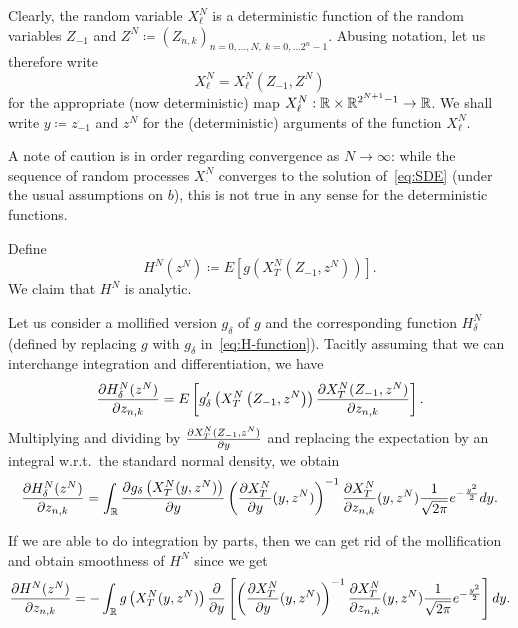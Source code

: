 Clearly, the random variable $X^N_\ell$ is a deterministic function of the
random variables $Z_{-1}$ and $Z^N \coloneqq \left(Z_{n,k} \right)_{n=0,
  \ldots, N, \ k=0, \ldots 2^n-1}$. Abusing notation, let us therefore write
\begin{equation*}
  X^N_\ell = X^N_\ell\left(Z_{-1}, Z^N \right)
\end{equation*}
for the appropriate (now deterministic) map $X^N_\ell: \mathbb{R} \times
\mathbb{R}^{2^{N+1}-1} \to \mathbb{R}$. We shall write $y \coloneqq z_{-1}$ and $z^N$ for the
(deterministic) arguments of the function $X^N_\ell$.

A note of caution is in order regarding convergence as $N \to \infty$: while
the sequence of random processes $X^N_\cdot$ converges to the solution
of~\eqref{eq:SDE} (under the usual assumptions on $b$), this is not true in
any sense for the deterministic functions.

Define
\begin{equation}
  \label{eq:H-function}
  H^N(z^N) \coloneqq E\left[ g\left( X^N_T\left( Z_{-1}, z^N \right) \right) \right].
\end{equation}
We claim that $H^N$ is analytic.

Let us consider a mollified version $g_\delta$ of $g$ and the corresponding
function $H^N_\delta$ (defined by replacing $g$ with $g_\delta$
in~\eqref{eq:H-function}). Tacitly assuming that we can interchange
integration and differentiation, we have
\begin{equation*}
  \frac{\partial H^N_\delta(z^N)}{\partial z_{n,k}} = E\left[ g_\delta^\prime\left( X^N_T\left( Z_{-1},
    z^N \right) \right) \frac{\partial X^N_T(Z_{-1}, z^N)}{\partial z_{n,k}}\right].
\end{equation*}
Multiplying and dividing by $\frac{\partial X^N_T(Z_{-1}, z^N)}{\partial y}$ and replacing
the expectation by an integral w.r.t.~the standard normal density, we obtain
\begin{equation}
  \label{eq:1}
  \frac{\partial H^N_\delta(z^N)}{\partial z_{n,k}} = \int_{\mathbb{R}} \frac{\partial g_\delta\left( X^N_T
      (y, z^N) \right)}{\partial y} \left( \frac{\partial X^N_T}{\partial y}(y, z^N)
  \right)^{-1} \frac{\partial X^N_T}{\partial z_{n,k}}(y, z^N) \frac{1}{\sqrt{2\pi}}
  e^{-\frac{y^2}{2}} dy.
\end{equation}

If we are able to do integration by parts, then we can get rid of the
mollification and obtain smoothness of $H^N$ since we get
\begin{equation*}
  \frac{\partial H^N(z^N)}{\partial z_{n,k}} = -\int_{\mathbb{R}} g\left( X^N_T
      (y, z^N) \right) \frac{\partial}{\partial y} \left[ \left( \frac{\partial X^N_T}{\partial y}(y, z^N)
  \right)^{-1} \frac{\partial X^N_T}{\partial z_{n,k}}(y, z^N) \frac{1}{\sqrt{2\pi}}
  e^{-\frac{y^2}{2}}\right] dy.
\end{equation*}

